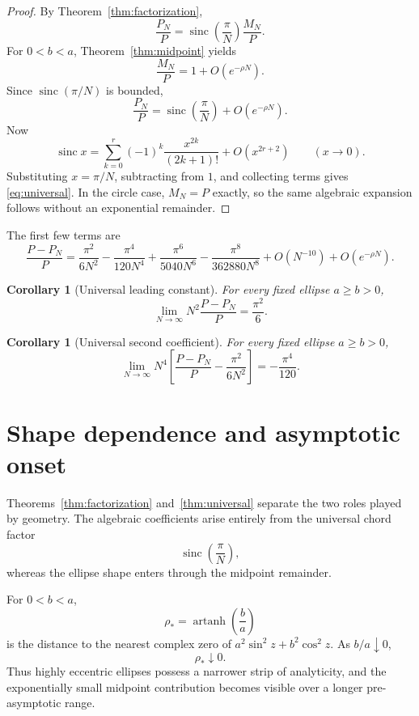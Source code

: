 \documentclass[11pt]{article}
\newtheorem{corollary}[theorem]{Corollary}
\theoremstyle{definition}
\newcommand{\sinc}{\operatorname{sinc}}
\numberwithin{equation}{section}
\begin{document}
\begin{proof}
By Theorem~\ref{thm:factorization},
\[
\frac{P_N}{P}
=
\sinc\!\left(\frac{\pi}{N}\right)
\frac{M_N}{P}.
\]
For \(0<b<a\), Theorem~\ref{thm:midpoint} yields
\[
\frac{M_N}{P}
=
1+O(e^{-\rho N}).
\]
Since \(\sinc(\pi/N)\) is bounded,
\[
\frac{P_N}{P}
=
\sinc\!\left(\frac{\pi}{N}\right)
+
O(e^{-\rho N}).
\]
Now
\[
\sinc x
=
\sum_{k=0}^{r}
(-1)^k\frac{x^{2k}}{(2k+1)!}
+
O(x^{2r+2})
\qquad (x\to0).
\]
Substituting \(x=\pi/N\), subtracting from \(1\), and collecting terms
gives \eqref{eq:universal}.  In the circle case, \(M_N=P\) exactly, so
the same algebraic expansion follows without an exponential remainder.
\end{proof}

The first few terms are
\begin{equation}
\label{eq:firstterms}
\frac{P-P_N}{P}
=
\frac{\pi^2}{6N^2}
-\frac{\pi^4}{120N^4}
+\frac{\pi^6}{5040N^6}
-\frac{\pi^8}{362880N^8}
+O(N^{-10})
+O(e^{-\rho N}).
\end{equation}

\begin{corollary}[Universal leading constant]
\label{cor:leading}
For every fixed ellipse \(a\ge b>0\),
\begin{equation}
\boxed{
\lim_{N\to\infty}
N^2\frac{P-P_N}{P}
=
\frac{\pi^2}{6}.
}
\end{equation}
\end{corollary}

\begin{corollary}[Universal second coefficient]
For every fixed ellipse \(a\ge b>0\),
\[
\lim_{N\to\infty}
N^4
\left[
\frac{P-P_N}{P}
-\frac{\pi^2}{6N^2}
\right]
=
-\frac{\pi^4}{120}.
\]
\end{corollary}

\section{Shape dependence and asymptotic onset}

Theorems~\ref{thm:factorization} and~\ref{thm:universal} separate the
two roles played by geometry.
The algebraic coefficients arise entirely from the universal chord
factor
\[
\sinc\!\left(\frac{\pi}{N}\right),
\]
whereas the ellipse shape enters through the midpoint remainder.

For \(0<b<a\),
\[
\rho_*=
\operatorname{artanh}\!\left(\frac ba\right)
\]
is the distance to the nearest complex zero of
\(a^2\sin^2z+b^2\cos^2z\).  As \(b/a\downarrow0\),
\[
\rho_*\downarrow0.
\]
Thus highly eccentric ellipses possess a narrower strip of analyticity,
and the exponentially small midpoint contribution becomes visible over
a longer pre-asymptotic range.
\end{document}
